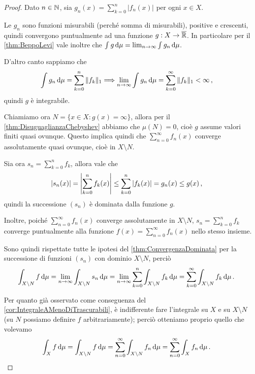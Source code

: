 \begin{proof}
	Dato $n\in \mathbb N$, sia $g_n(x)=\sum_{k=0}^n|f_n(x)|$ per ogni $x\in X$. 
	
	Le $g_n$ sono funzioni misurabili (perché somma di misurabili), positive e crescenti, quindi convergono puntualmente ad una funzione $g:X\to\overline{\mathbb R}$. In particolare per il \cref{thm:BeppoLevi} vale inoltre che $\int g\,\mathrm d\mu=\lim_{n\to\infty}\int g_n\,\mathrm d\mu$.
	
	D'altro canto sappiamo che 
	\begin{equation*}
		\int g_n\,\mathrm d\mu=\sum_{k=0}^n\Vert  f_k\Vert_1 \Longrightarrow \lim_{n\to\infty}\int g_n\,\mathrm d\mu=\sum_{k=0}^\infty \Vert  f_k\Vert_1<\infty\, \text{, }
	\end{equation*}
	quindi $g$ è integrabile.
	
	Chiamiamo ora $N=\{ x\in X:g(x)=\infty\}$, allora per il \cref{thm:DisuguaglianzaChebyshev} abbiamo che $\mu(N)=0$, cioè $g$ assume valori finiti quasi ovunque. Questo implica quindi che $\sum_{n=0}^\infty f_n(x)$ converge assolutamente quasi ovunque, cioè in $X\setminus N$.
	
	Sia ora $s_n=\sum_{k=0}^n f_k$, allora vale che
	\begin{equation*}
		|s_n(x)|=\left|\sum_{k=0}^n f_k(x)\right|\le \sum_{k=0}^n |f_k(x)|=g_n(x)\le g(x)\, \text{, }
	\end{equation*}
	quindi la successione $(s_n)$ è dominata dalla funzione $g$.
	
	Inoltre, poiché $\sum_{n=0}^\infty f_n(x)$ converge assolutamente in $X\setminus N$, $s_n=\sum_{k=0}^n f_k$ converge puntualmente alla funzione $f(x)=\sum_{n=0}^\infty f_n(x)$ nello stesso insieme.
	
	Sono quindi rispettate tutte le ipotesi del \cref{thm:ConvergenzaDominata} per la successione di funzioni $(s_n)$ con dominio $X\setminus N$, perciò
	\begin{equation*}
		\int_{X\setminus N} f\,\mathrm d\mu=\lim_{n\to\infty}\int_{X\setminus N}s_n\,\mathrm d\mu=\lim_{n\to\infty}\sum_{k=0}^n\int_{X\setminus N}  f_k\,\mathrm d\mu= \sum_{k=0}^\infty\int_{X\setminus N}f_k\,\mathrm d\mu\, \text{. }
	\end{equation*}

	Per quanto già osservato come conseguenza del \cref{cor:IntegraleAMenoDiTrascurabili}, è indifferente fare l'integrale su $X$ e su $X\setminus N$ (su $N$ possiamo definire $f$ arbitrariamente); perciò otteniamo proprio quello che volevamo
	\begin{equation*}
		\int_X f\,\mathrm d\mu=\int_{X\setminus N} f\,\mathrm d\mu=\sum_{n=0}^\infty\int_{X\setminus N}f_n\,\mathrm d\mu=\sum_{n=0}^\infty\int_X f_n\,\mathrm d\mu\, \text{. }
	\end{equation*}
\end{proof}

